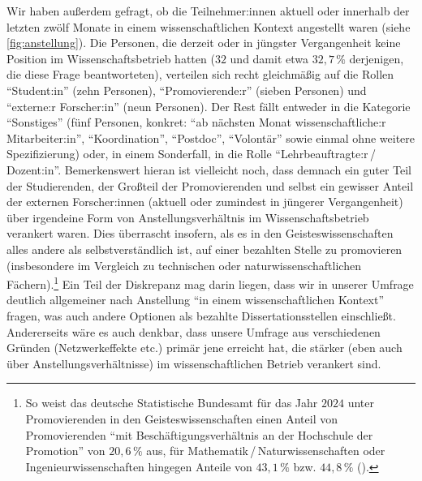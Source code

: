 \documentclass{scrartcl}
\begin{document}
Wir haben außerdem gefragt, ob die Teilnehmer:innen aktuell oder innerhalb der letzten zwölf Monate in einem wissenschaftlichen Kontext angestellt waren (siehe \autoref{fig:anstellung}).
Die Personen, die derzeit oder in jüngster Vergangenheit keine Position im Wissenschaftsbetrieb hatten ($32$ und damit etwa $32,7\,\%$ derjenigen, die diese Frage beantworteten), verteilen sich recht gleichmäßig auf die Rollen \enquote{Student:in} (zehn Personen), \enquote{Promovierende:r} (sieben Personen) und \enquote{externe:r Forscher:in} (neun Personen).
Der Rest fällt entweder in die Kategorie \enquote{Sonstiges} (fünf Personen, konkret: \enquote{ab nächsten Monat wissenschaftliche:r Mitarbeiter:in}, \enquote{Koordination}, \enquote{Postdoc}, \enquote{Volontär} sowie einmal ohne weitere Spezifizierung) oder, in einem Sonderfall, in die Rolle \enquote{Lehrbeauftragte:r\,/\,Dozent:in}.
Bemerkenswert hieran ist vielleicht noch, dass demnach ein guter Teil der Studierenden, der Großteil der Promovierenden und selbst ein gewisser Anteil der externen Forscher:innen (aktuell oder zumindest in jüngerer Vergangenheit) über irgendeine Form von Anstellungsverhältnis im Wissenschaftsbetrieb verankert waren.
Dies überrascht insofern, als es in den Geisteswissenschaften alles andere als selbstverständlich ist, auf einer bezahlten Stelle zu promovieren (insbesondere im Vergleich zu technischen oder naturwissenschaftlichen Fächern).\footnote{So weist das deutsche Statistische Bundesamt für das Jahr $2024$ unter Promovierenden in den Geisteswissenschaften einen Anteil von Promovierenden \enquote{mit Beschäftigungsverhältnis an der Hochschule der Promotion} von $20,6\,\%$ aus, für Mathematik\,/\,Naturwissenschaften oder Ingenieurwissenschaften hingegen Anteile von $43,1\,\%$ bzw. $44,8\,\%$ (\autocite[vgl.][]{statistisches_bundesamt_tabelle_2025}).}
Ein Teil der Diskrepanz mag darin liegen, dass wir in unserer Umfrage deutlich allgemeiner nach Anstellung \enquote{in einem wissenschaftlichen Kontext} fragen, was auch andere Optionen als bezahlte Dissertationsstellen einschließt.
Andererseits wäre es auch denkbar, dass unsere Umfrage aus verschiedenen Gründen (Netzwerkeffekte etc.) primär jene erreicht hat, die stärker (eben auch über Anstellungsverhältnisse) im wissenschaftlichen Betrieb verankert sind.
\end{document}
